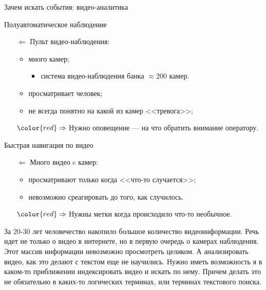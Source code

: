 
\begin{frame}{Зачем искать события: видео-аналитика}
    \begin{orange-box}{Полуавтоматическое наблюдение}
        \begin{itemize}
            \item[$\Leftarrow$] Пульт видео-наблюдения:
            \begin{itemize}
                \item много камер;
                \begin{itemize}
                    \item система видео-наблюдения банка 
                    $\approx 200$ камер.
                \end{itemize}
                \item просматривает человек;
                \item не всегда понятно на какой из камер <<тревога>>;
            \end{itemize}
            \item[${\color{red}\Rightarrow}$] Нужно оповещение — на что обратить внимание оператору.
        \end{itemize}
    \end{orange-box}
    \vspace{1.5em}
    \begin{blue-box}{Быстрая навигация по видео}
        \begin{itemize}
            \item[$\Leftarrow$] Много видео c камер:
            \begin{itemize}
                \item просматривают только когда <<что-то случается>>;
                \item невозможно среагировать до того, как случилось.
            \end{itemize}
            \item[${\color{red}\Rightarrow}$] Нужны метки когда 
            происходило что-то необычное.
        \end{itemize}
    \end{blue-box}
\end{frame}

\begin{note-frame}
    За 20-30 лет человечество накопило большое 
    количество видеоинформации.
    Речь идет не только о видео в интернете, 
    но в первую очередь о камерах
    наблюдения. Этот массив информации невозможно просмотреть целиком.
    А анализировать видео, как это делают с текстом еще не научились.
    Нужно иметь возможность я в каком-то приближении индексировать
    видео и искать по нему. Причем делать это не обязательно
    в каких-то логических терминах, или терминах текстового поиска.
\end{note-frame}
